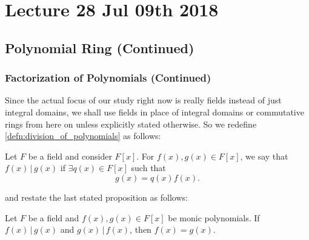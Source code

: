 \chapter{Lecture 28 Jul 09th 2018}%
\label{chp:lecture_28_jul_09th_2018}

\section{Polynomial Ring (Continued)}%
\label{sec:polynomial_ring_continued}

\subsection{Factorization of Polynomials (Continued)}%
\label{sub:factorization_of_polynomials_continued}

Since the actual focus of our study right now is really fields instead of just integral domains, we shall use fields in place of integral domains or commutative rings from here on unless explicitly stated otherwise. So we redefine \cref{defn:division_of_polynomials} as follows:

\begin{defnnonum}
  Let $F$ be a field and consider $F[x]$. For $f(x), g(x) \in F[x]$, we say that $f(x) \, | \, g(x)$ if $\exists q(x) \in F[x]$ such that
  \begin{equation*}
    g(x) = q(x) f(x).
  \end{equation*}
\end{defnnonum}

and restate the last stated proposition as follows:

\begin{propo}[$f(x) \, | \, g(x) \, \land \, g(x) \, | \, f(x) \implies f(x) = g(x)$]
\label{propo:f_div_g_and_g_div_f_implies_f_is_g}
Let $F$ be a field and $f(x), g(x) \in F[x]$ be monic polynomials. If $f(x) \, | \, g(x)$ and $g(x) \, | \, f(x)$, then $f(x) = g(x)$.
\end{propo}

